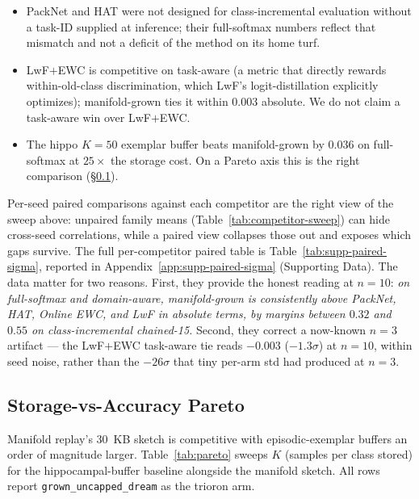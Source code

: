 \documentclass[11pt]{article}
\newcommand{\arm}[1]{\texttt{#1}}
\begin{document}
\begin{itemize}[leftmargin=1.5em]
  \item PackNet and HAT were not designed for class-incremental
        evaluation without a task-ID supplied at inference; their
        full-softmax numbers reflect that mismatch and not a deficit
        of the method on its home turf.
  \item LwF$+$EWC is competitive on task-aware (a metric that
        directly rewards within-old-class discrimination, which LwF's
        logit-distillation explicitly optimizes); manifold-grown ties
        it within $0.003$ absolute. We do not claim a task-aware
        win over LwF$+$EWC.
  \item The hippo $K = 50$ exemplar buffer beats manifold-grown by
        $0.036$ on full-softmax at $25\times$ the storage cost. On a
        Pareto axis this is the right comparison
        (\S\ref{sec:pareto}).
\end{itemize}

Per-seed paired comparisons against each competitor are the right
view of the sweep above: unpaired family means
(Table~\ref{tab:competitor-sweep}) can hide cross-seed correlations,
while a paired view collapses those out and exposes which gaps
survive. The full per-competitor paired table is
Table~\ref{tab:supp-paired-sigma}, reported in
Appendix~\ref{app:supp-paired-sigma} (Supporting Data). The data
matter for two reasons. First, they provide the honest reading at
$n = 10$: \emph{on full-softmax and domain-aware, manifold-grown is
consistently above PackNet, HAT, Online EWC, and LwF in absolute
terms, by margins between $0.32$ and $0.55$ on class-incremental
chained-15.} Second, they correct a now-known $n = 3$ artifact ---
the LwF$+$EWC task-aware tie reads $-0.003$ ($-1.3\sigma$) at
$n = 10$, within seed noise, rather than the $-26\sigma$ that tiny
per-arm std had produced at $n = 3$.

\subsection{Storage-vs-Accuracy Pareto}
\label{sec:pareto}

Manifold replay's 30~KB sketch is competitive with episodic-exemplar
buffers an order of magnitude larger.
Table~\ref{tab:pareto} sweeps $K$ (samples per class stored) for the
hippocampal-buffer baseline alongside the manifold sketch. All rows
report \arm{grown\_uncapped\_dream} as the trioron arm.
\end{document}
